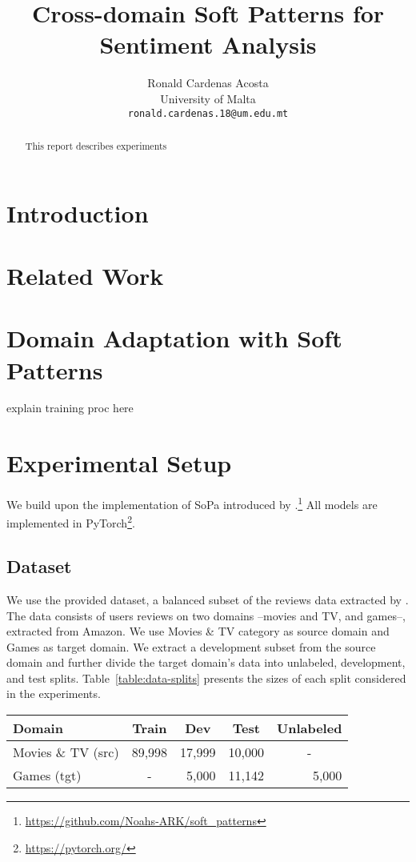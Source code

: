\documentclass[11pt,a4paper]{article}
\title{Cross-domain Soft Patterns for Sentiment Analysis}
\author{Ronald Cardenas Acosta\\
  University of Malta \\
  {\tt ronald.cardenas.18@um.edu.mt} \\}
\date{}
\begin{document}
\maketitle
\begin{abstract}
  This report describes experiments 
\end{abstract}


\section{Introduction}



\section{Related Work}

\section{Domain Adaptation with Soft Patterns}

explain training proc here


\section{Experimental Setup}

We build upon the implementation of SoPa introduced by \citet{schwartz2018sopa}.\footnote{\url{https://github.com/Noahs-ARK/soft_patterns}} All models are implemented in PyTorch\footnote{\url{https://pytorch.org/}}.

\subsection{Dataset}

We use the provided dataset, a balanced subset of the reviews data extracted by \citet{mcauley2015image}. The data consists of users reviews on two domains --movies and TV, and games--, extracted from Amazon.
We use Movies \& TV category as source domain and Games as target domain. We extract a development subset from the source domain and further divide the target domain's data into unlabeled, development, and test splits. Table~\ref{table:data-splits} presents the sizes of each split considered in the experiments.

\begin{table*}[]
\centering
\begin{tabular}{|l|c|r|r|c|}
\hline
Domain              & Train                       & \multicolumn{1}{c|}{Dev} & \multicolumn{1}{c|}{Test} & Unlabeled                  \\ \hline
Movies \& TV (src) & \multicolumn{1}{r|}{89,998} & 17,999                   & 10,000                    & -                          \\ \hline
Games (tgt)         & -                           & 5,000                    & 11,142                    & \multicolumn{1}{r|}{5,000} \\ \hline
\end{tabular}
\caption{Size of data splits in source (src) and target (tgt) domains.}
\label{table:data-splits}
\end{table*}
\end{document}
